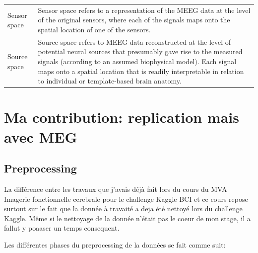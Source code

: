 \begin{table}[ht]
\begin{tabular}{@{}| p{3cm}|p{10cm}| @{}}
        Sensor space & Sensor space refers to a representation of the MEEG data at the level of the original sensors, where each of the signals maps onto the spatial location of one of the sensors.                                                                                                                                           \\
        Source space & Source space refers to MEEG data reconstructed at the level of potential neural sources that presumably gave rise to the measured signals (according to an assumed biophysical model). Each signal maps onto a spatial location that is readily interpretable in relation to individual or template-based brain anatomy. \\
        \hline
    \end{tabular}

    \label{Tab:Glossary_protocol}
\end{table}

\chapter{Ma contribution: replication mais avec MEG}



\section{Preprocessing}

La différence entre les travaux que j'avais déjà fait lors du cours du MVA Imagerie fonctionnelle cerebrale pour le challenge Kaggle BCI et ce cours repose surtout sur le fait que la donnée à travaité a deja été nettoyé lors du challenge Kaggle. Même si le nettoyage de la donnée n'était pas le coeur de mon stage, il a fallut y poaaser un temps consequent.

Les différentes phases du preprocessing de la données se fait comme suit:


